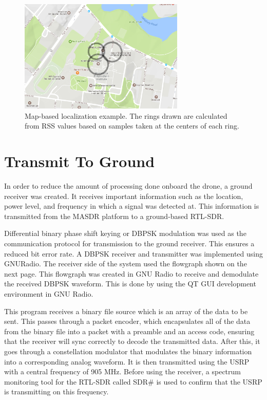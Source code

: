 \begin{figure}[h!]
\centering
\includegraphics[width=0.70\textwidth]{img/localization_map_visualization.png}
\caption{Map-based localization example. The rings drawn are calculated from RSS values based on samples taken at the centers of each ring.}
\label{fig:map_localize}
\end{figure}

\section{Transmit To Ground}

In order to reduce the amount of processing done onboard the drone, a ground receiver was created.  It receives important information such as the location, power level, and frequency in which a signal was detected at.  This information is transmitted from the MASDR platform to a ground-based RTL-SDR.\par

Differential binary phase shift keying or DBPSK modulation was used as the communication protocol for transmission to the ground receiver. This ensures a reduced bit error rate. A DBPSK receiver and transmitter was implemented using GNURadio. The receiver side of the system used the flowgraph shown on the next page. This flowgraph was created in GNU Radio to receive and demodulate the received DBPSK waveform. This is done by using the QT GUI development environment in GNU Radio.\par


This program receives a binary file source which is an array of the data to be sent. This passes through a packet encoder, which encapsulates all of the data from the binary file into a packet with a preamble and an access code, ensuring that the receiver will sync correctly to decode the transmitted data.  After this, it goes through a constellation modulator that modulates the binary information into a corresponding analog waveform. It is then transmitted using the USRP with a central frequency of 905 MHz.  Before using the receiver, a spectrum monitoring tool for the RTL-SDR called SDR\# is used to confirm that the USRP is transmitting on this frequency.\par

